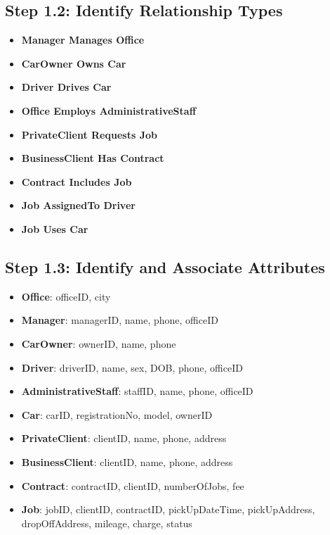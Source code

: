 \documentclass[a4paper,12pt]{article}
\begin{document}
\subsection*{Step 1.2: Identify Relationship Types}
\begin{itemize}
    \item \textbf{Manager Manages Office}
    \item \textbf{CarOwner Owns Car}
    \item \textbf{Driver Drives Car}
    \item \textbf{Office Employs AdministrativeStaff}
    \item \textbf{PrivateClient Requests Job}
    \item \textbf{BusinessClient Has Contract}
    \item \textbf{Contract Includes Job}
    \item \textbf{Job AssignedTo Driver}
    \item \textbf{Job Uses Car}
\end{itemize}

\subsection*{Step 1.3: Identify and Associate Attributes}
\begin{itemize}
    \item \textbf{Office}: officeID, city
    \item \textbf{Manager}: managerID, name, phone, officeID
    \item \textbf{CarOwner}: ownerID, name, phone
    \item \textbf{Driver}: driverID, name, sex, DOB, phone, officeID
    \item \textbf{AdministrativeStaff}: staffID, name, phone, officeID
    \item \textbf{Car}: carID, registrationNo, model, ownerID
    \item \textbf{PrivateClient}: clientID, name, phone, address
    \item \textbf{BusinessClient}: clientID, name, phone, address
    \item \textbf{Contract}: contractID, clientID, numberOfJobs, fee
    \item \textbf{Job}: jobID, clientID, contractID, pickUpDateTime, pickUpAddress, dropOffAddress, mileage, charge, status
\end{itemize}
\end{document}
